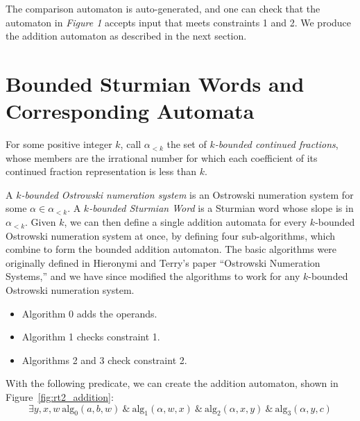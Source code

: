 \documentclass[landscape]{sciposter}
\begin{document}
\begin{multicols}{3}
The comparison automaton is auto-generated, and one can check that the automaton in \emph{Figure 1} accepts input that meets constraints 1 and 2. 
We produce the addition automaton as described in the next section.

\columnbreak


\section*{Bounded Sturmian Words and Corresponding Automata}

For some positive integer $k$, call $\alpha_{<k}$ the set of \textit{$k$-bounded continued fractions}, whose members are the irrational number for which each coefficient of its continued fraction representation is less than $k$.

A \textit{$k$-bounded Ostrowski numeration system} is an Ostrowski numeration system for some $\alpha \in \alpha_{<k}$. 
A \textit{$k$-bounded Sturmian Word} is a Sturmian word whose slope is in $\alpha_{<k}$.
Given $k$, we can then define a single addition automata for every $k$-bounded Ostrowski numeration system at once, by defining four sub-algorithms, which combine to form the bounded addition automaton.
The basic algorithms were originally defined in Hieronymi and Terry's paper ``Ostrowski Numeration Systems,'' and we have since modified the algorithms to work for any $k$-bounded Ostrowski numeration system.

\begin{itemize}
\item Algorithm 0 adds the operands.
\item Algorithm 1 checks constraint 1.
\item Algorithms 2 and 3 check constraint 2.
\end{itemize}

With the following predicate, we can create the addition automaton, shown in Figure~\ref{fig:rt2_addition}: {
$$\exists y,x,w ~\text{alg}_0(a,b,w) ~\& ~\text{alg}_1(\alpha,w,x) ~\& ~\text{alg}_2(\alpha,x,y) ~\& ~\text{alg}_3(\alpha,y,c)$$}


\end{multicols}
\end{document}
